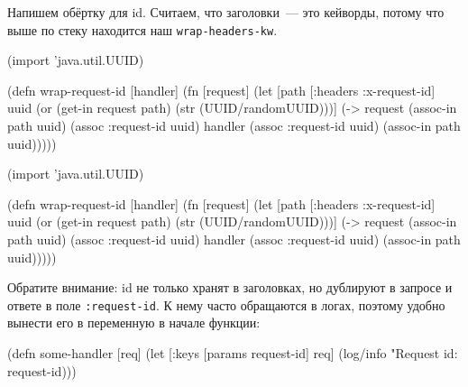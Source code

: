 
Напишем обёртку для id. Считаем, что заголовки~--- это кейворды, потому что выше
по стеку находится наш \verb|wrap-headers-kw|.

\ifnarrow

\begin{english}
  \begin{clojure}
(import 'java.util.UUID)

(defn wrap-request-id [handler]
  (fn [request]
    (let [path [:headers :x-request-id]
          uuid (or
                (get-in request path)
                (str
                  (UUID/randomUUID)))]
      (-> request
          (assoc-in path uuid)
          (assoc :request-id uuid)
          handler
          (assoc :request-id uuid)
          (assoc-in path uuid)))))
  \end{clojure}
\end{english}

\else

\begin{english}
  \begin{clojure}
(import 'java.util.UUID)

(defn wrap-request-id [handler]
  (fn [request]
    (let [path [:headers :x-request-id]
          uuid (or (get-in request path)
                   (str (UUID/randomUUID)))]
      (-> request
          (assoc-in path uuid)
          (assoc :request-id uuid)
          handler
          (assoc :request-id uuid)
          (assoc-in path uuid)))))
  \end{clojure}
\end{english}

\fi


Обратите внимание: id не только хранят в заголовках, но дублируют в запросе и
ответе в поле \verb|:request-id|. К нему часто обращаются в логах, поэтому
удобно вынести его в переменную в начале функции:


\ifnarrow

\begin{english}
  \begin{clojure}
(defn some-handler [req]
  (let [{:keys [params request-id]} req]
    (log/info "Request id: %
              request-id)))
  \end{clojure}
\end{english}

